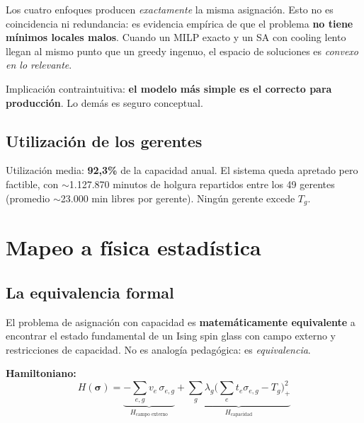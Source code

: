 \documentclass[11pt,a4paper]{article}
\begin{document}
\begin{insightbox}
Los cuatro enfoques producen \emph{exactamente} la misma asignación. Esto no es coincidencia ni redundancia: es evidencia empírica de que el problema \textbf{no tiene mínimos locales malos}. Cuando un MILP exacto y un SA con cooling lento llegan al mismo punto que un greedy ingenuo, el espacio de soluciones es \emph{convexo en lo relevante}.

Implicación contraintuitiva: \textbf{el modelo más simple es el correcto para producción}. Lo demás es seguro conceptual.
\end{insightbox}

\subsection{Utilización de los gerentes}

Utilización media: \textbf{92,3\%} de la capacidad anual. El sistema queda apretado pero factible, con $\sim$1.127.870 minutos de holgura repartidos entre los 49 gerentes (promedio $\sim$23.000 min libres por gerente). Ningún gerente excede $T_g$.

\section{Mapeo a física estadística}

\subsection{La equivalencia formal}

El problema de asignación con capacidad es \textbf{matemáticamente equivalente} a encontrar el estado fundamental de un Ising spin glass con campo externo y restricciones de capacidad. No es analogía pedagógica: es \emph{equivalencia}.

\textbf{Hamiltoniano:}
\begin{equation*}
\boxed{H(\boldsymbol{\sigma}) = \underbrace{-\sum_{e,g} v_e \, \sigma_{e,g}}_{H_{\text{campo externo}}} + \underbrace{\sum_g \lambda_g \Big(\sum_e t_e \sigma_{e,g} - T_g\Big)_+^2}_{H_{\text{capacidad}}}}
\end{equation*}
\end{document}
